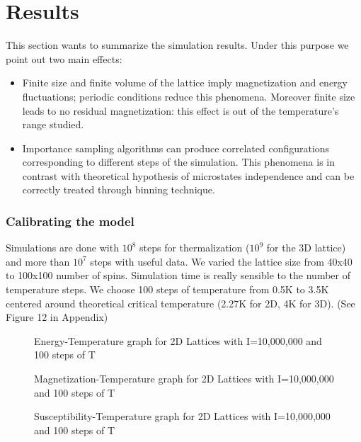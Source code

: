 \documentclass[11pt,a4paper]{article}
\begin{document}
\section{Results}
This section wants to summarize the simulation results. Under this purpose we point out two main effects:

\begin{itemize}
\item Finite size and finite volume of the lattice imply magnetization and energy fluctuations; periodic conditions reduce this phenomena. Moreover finite size leads to no residual magnetization: this effect is out of the temperature's range studied.

\item Importance sampling algorithms can produce correlated configurations corresponding to different steps of the simulation. This phenomena is in contrast with theoretical hypothesis of microstates independence and can be correctly treated through binning technique. 
\end{itemize}

\subsubsection*{Calibrating the model}
Simulations are done with $10^8$ steps for thermalization ($10^9$ for the 3D lattice) and more than $10^7$ steps with useful data. We varied the lattice size from 40x40 to 100x100 number of spins. Simulation time is really sensible to the number of temperature steps. We choose 100 steps of temperature from 0.5K to 3.5K centered around theoretical critical temperature (2.27K for 2D, 4K for 3D). (See Figure 12 in Appendix) 

\begin{figure}[h!]
  \centering
  
  \caption{Energy-Temperature graph for 2D Lattices with I=10,000,000 and 100 steps of T}
\end{figure}

\begin{figure}[h!]
  \centering

  \caption{Magnetization-Temperature graph for 2D Lattices with I=10,000,000 and 100 steps of T}
\end{figure}

\begin{figure}[h!]
  \centering
 
  \caption{Susceptibility-Temperature graph for 2D Lattices with I=10,000,000 and 100 steps of T}
\end{figure}
\end{document}
